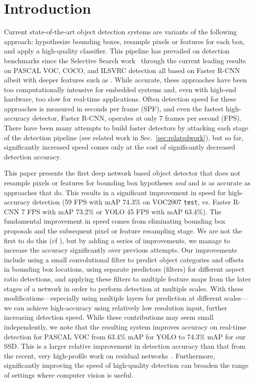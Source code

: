\documentclass[runningheads]{llncs}
\begin{document}
\section{Introduction}
Current state-of-the-art object detection systems are variants of the following approach: hypothesize bounding boxes, resample pixels or features for each box, and apply a high-quality classifier. This pipeline has prevailed on detection benchmarks since the Selective Search work~\cite{uijlings2013selective} through the current leading results on PASCAL VOC, COCO, and ILSVRC detection all based on Faster R-CNN\cite{ren2015faster} albeit with deeper features such as \cite{kaiming2015resiual}. While accurate, these approaches have been too computationally intensive for embedded systems and, even with high-end hardware, too slow for real-time applications. Often detection speed for these approaches is measured in seconds per frame (SPF), and even the fastest high-accuracy detector, Faster R-CNN, operates at only 7 frames per second (FPS). There have been many attempts to build faster detectors by attacking each stage of the detection pipeline (see related work in Sec.~\ref{sec:relatedwork}), but so far, significantly increased speed comes only at the cost of significantly decreased detection accuracy.

This paper presents the first deep network based object detector that does not resample pixels or features for bounding box hypotheses {\em and} and is as accurate as approaches that do. This results in a significant improvement in speed for high-accuracy detection (59 FPS with mAP 74.3\% on VOC2007 \texttt{test}, vs. Faster R-CNN 7 FPS with mAP 73.2\% or YOLO 45 FPS with mAP 63.4\%). The fundamental improvement in speed comes from eliminating bounding box proposals and the subsequent pixel or feature resampling stage. We are not the first to do this (cf \cite{sermanet2013overfeat,redmon2015you}), but by adding a series of improvements, we manage to increase the accuracy significantly over previous attempts. Our improvements include using a small convolutional filter to predict object categories and offsets in bounding box locations, using separate predictors (filters) for different aspect ratio detections, and applying these filters to multiple feature maps from the later stages of a network in order to perform detection at multiple scales. With these modifications---especially using multiple layers for prediction at different scales---we can achieve high-accuracy using relatively low resolution input, further increasing detection speed. While these contributions may seem small independently, we note that the resulting system improves accuracy on real-time detection for PASCAL VOC from 63.4\% mAP for YOLO to 74.3\% mAP for our SSD. This is a larger relative improvement in detection accuracy than that from the recent, very high-profile work on residual networks~\cite{kaiming2015resiual}. Furthermore, significantly improving the speed of high-quality detection can broaden the range of settings where computer vision is useful.
\end{document}
